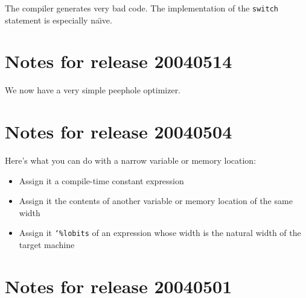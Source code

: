 \documentclass{article}
\begin{document}
The compiler generates very bad code.
The implementation of the \texttt{switch} statement is especially
na\"\i ve.


\section{Notes for release 20040514}

We now have a very simple peephole optimizer.


\section{Notes for release 20040504}

Here's what you can do with a narrow variable or memory location:
\begin{itemize}
\item
Assign it a compile-time constant expression
\item
Assign it the contents of another variable or memory location of the
same width
\item
Assign it \texttt{\char`\%lobits} of an expression whose width is the
natural width of the target machine
\end{itemize}


\section{Notes for release 20040501}
\end{document}
